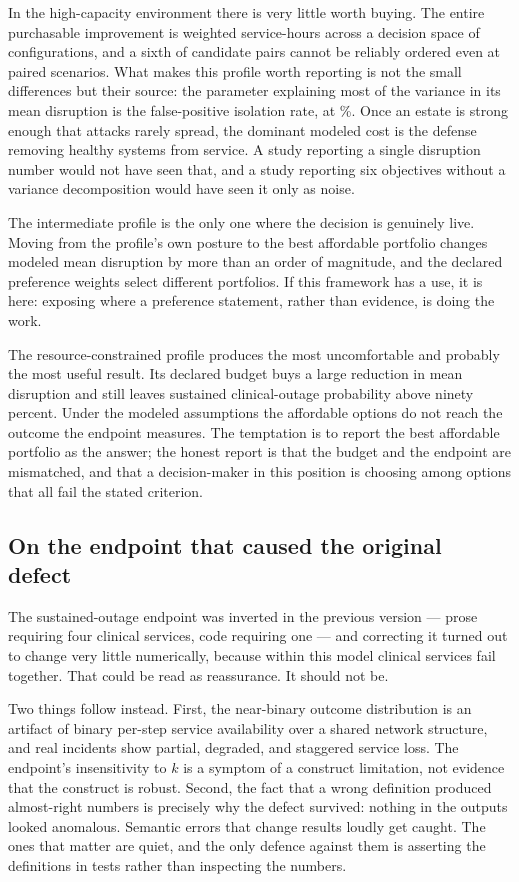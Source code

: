In the high-capacity environment there is very little worth buying. The
entire purchasable improvement is
\ConfirmHighCapacityMaxPurchasableImprovement{} weighted service-hours across
a decision space of \ConfirmHighCapacityCandidates{} configurations, and a
sixth of candidate pairs cannot be reliably ordered even at
\ConfirmHighCapacityScenarios{} paired scenarios. What makes this profile
worth reporting is not the small differences but their source: the parameter
explaining most of the variance in its mean disruption is the false-positive
isolation rate, at \SensitivityHighCapacityDominantEffect\%. Once an estate
is strong enough that attacks rarely spread, the dominant modeled cost is the
defense removing healthy systems from service. A study reporting a single
disruption number would not have seen that, and a study reporting six
objectives without a variance decomposition would have seen it only as noise.

The intermediate profile is the only one where the decision is genuinely
live. Moving from the profile's own posture to the best affordable portfolio
changes modeled mean disruption by more than an order of magnitude, and the
declared preference weights select different portfolios. If this framework
has a use, it is here: exposing where a preference statement, rather than
evidence, is doing the work.

The resource-constrained profile produces the most uncomfortable and probably
the most useful result. Its declared budget buys a large reduction in mean
disruption and still leaves sustained clinical-outage probability above
ninety percent. Under the modeled assumptions the affordable options do not
reach the outcome the endpoint measures. The temptation is to report the best
affordable portfolio as the answer; the honest report is that the budget and
the endpoint are mismatched, and that a decision-maker in this position is
choosing among options that all fail the stated criterion.

\subsection{On the endpoint that caused the original defect}

The sustained-outage endpoint was inverted in the previous version --- prose
requiring four clinical services, code requiring one --- and correcting it
turned out to change very little numerically, because within this model
clinical services fail together. That could be read as reassurance. It should
not be.

Two things follow instead. First, the near-binary outcome distribution is an
artifact of binary per-step service availability over a shared network
structure, and real incidents show partial, degraded, and staggered service
loss. The endpoint's insensitivity to $k$ is a symptom of a construct
limitation, not evidence that the construct is robust. Second, the fact that
a wrong definition produced almost-right numbers is precisely why the defect
survived: nothing in the outputs looked anomalous. Semantic errors that
change results loudly get caught. The ones that matter are quiet, and the
only defence against them is asserting the definitions in tests rather than
inspecting the numbers.
